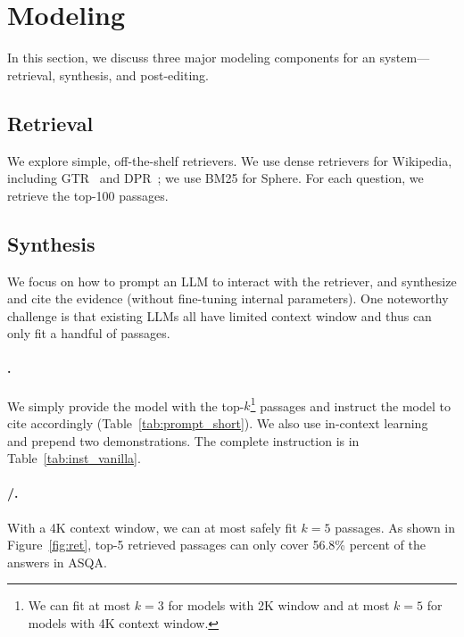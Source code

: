 


\section{Modeling}
\label{sec:modeling}



In this section,
we discuss three major modeling components for an \citeeval{} system---retrieval, synthesis, and post-editing.




\subsection{Retrieval}
\label{sec:retrieval}

We explore simple, off-the-shelf retrievers.
We use dense retrievers  for Wikipedia, including GTR~\cite{ni-etal-2022-large} and DPR~\cite{karpukhin-etal-2020-dense}; 
we use 
BM25 for Sphere. %
For each question,
we 
retrieve the top-100 passages. %



\subsection{Synthesis}
\label{sec:synthesis}





We  focus on %
how to
prompt an LLM to 
interact with the retriever, and 
synthesize and cite the evidence (without fine-tuning internal parameters).
One noteworthy challenge is that existing %
LLMs all have limited context window and thus
can only fit a handful of passages.





\paragraph{\textsc{\pvani{}}.}
We simply provide the model with the top-$k$\footnote{We can fit at most $k=3$ for models with 2K window and at most $k=5$ for models with 4K context window.} passages and instruct the model to cite accordingly (Table~\ref{tab:prompt_short}).
We also use in-context learning~\cite{brown2020language} and prepend two demonstrations.
The complete instruction is in Table~\ref{tab:inst_vanilla}.


\paragraph{\textsc{\psumm}/\textsc{\psnippet{}}.}
With a 4K context window, we can at most safely fit $k=5$ passages. As shown in Figure~\ref{fig:ret}, top-5 retrieved passages can only cover 56.8\% percent of the answers in ASQA. 

